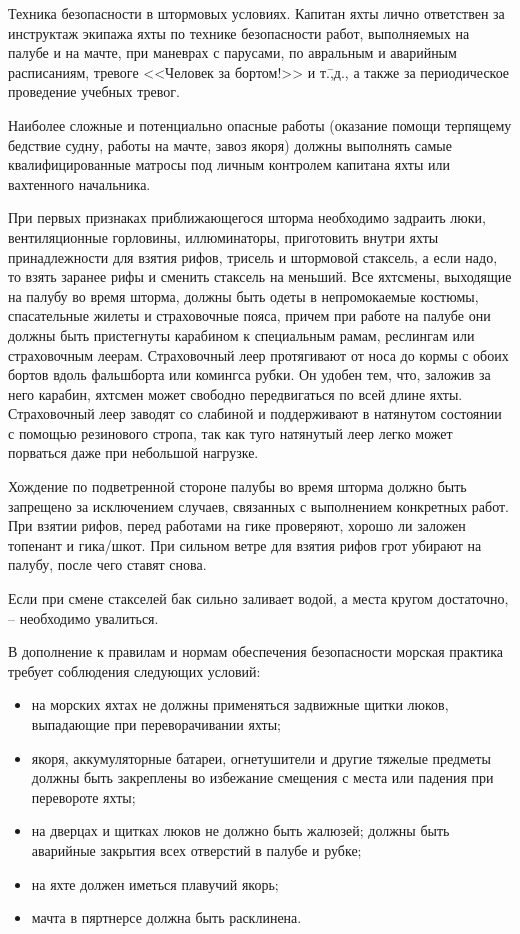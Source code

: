 Техника безопасности в штормовых условиях. Капитан яхты лично ответствен за инструктаж экипажа яхты по технике безопасности работ, выполняемых на палубе и на мачте, при маневрах с парусами, по авральным и аварийным расписаниям, тревоге <<Человек за бортом!>> и т.\=,д., а также за периодическое проведение учебных тревог. 

Наиболее сложные и потенциально опасные работы (оказание помощи терпящему бедствие судну, работы на мачте, завоз якоря) должны выполнять самые квалифицированные матросы под личным контролем капитана яхты или вахтенного начальника.

При первых признаках приближающегося шторма необходимо задраить люки, вентиляционные горловины, иллюминаторы, приготовить внутри яхты принадлежности для взятия рифов, трисель и штормовой стаксель, а если надо, то взять заранее рифы и сменить стаксель на меньший. Все яхтсмены, выходящие на палубу во время шторма, должны быть одеты в непромокаемые костюмы, спасательные жилеты и страховочные пояса, причем при работе на палубе они должны быть пристегнуты карабином к специальным рамам, реслингам или страховочным леерам. Страховочный леер протягивают от носа до кормы с обоих бортов вдоль фальшборта или комингса рубки. Он удобен тем, что, заложив за него карабин, яхтсмен может свободно передвигаться по всей длине яхты. Страховочный леер заводят со слабиной и поддерживают в натянутом состоянии с помощью резинового стропа, так как туго натянутый леер легко может порваться даже при небольшой нагрузке.

Хождение по подветренной стороне палубы во время шторма должно быть запрещено за исключением случаев, связанных с выполнением конкретных работ. При взятии рифов, перед работами на гике проверяют, хорошо ли заложен топенант и гика\-/шкот. При сильном ветре для взятия рифов грот убирают на палубу, после чего ставят снова.

Если при смене стакселей бак сильно заливает водой, а места кругом достаточно, \--- необходимо увалиться. 

В дополнение к правилам и нормам обеспечения безопасности морская практика требует соблюдения следующих условий:
\begin{itemize}
\item на морских яхтах не должны применяться задвижные щитки люков, выпадающие при переворачивании яхты; 
\item якоря, аккумуляторные батареи, огнетушители и другие тяжелые предметы должны быть закреплены во избежание смещения с места или падения при перевороте яхты; 
\item на дверцах и щитках люков не должно быть жалюзей; должны быть аварийные закрытия всех отверстий в палубе и рубке; 
\item на яхте должен иметься плавучий якорь; 
\item мачта в пяртнерсе должна быть расклинена. 
\end{itemize}

